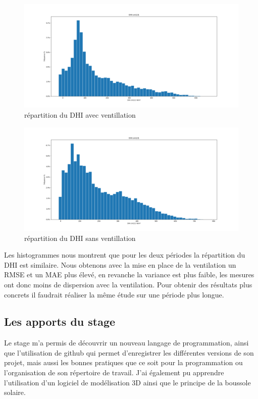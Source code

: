 \documentclass[12pt,a4paper]{article}
\begin{document}
\begin{flushleft}
\begin{figure}[H]
\centering
\includegraphics[width=15cm]{image/impact_ventillation/avril_mai_2021/histogramme_3.png}  
\caption{répartition du DHI avec ventillation}  
\end{figure}

\begin{figure}[H]
\centering
\includegraphics[width=15cm]{image/impact_ventillation/archive_2021-03-11_2021-04-20/histogramme_3.png} 
\caption{répartition du DHI sans ventillation}  
\end{figure}

Les histogrammes nous montrent que pour les deux périodes la répartition du DHI est similaire.
Nous obtenons avec la mise en place de la ventilation un RMSE et un MAE plus élevé, en revanche la variance est plus faible, les mesures ont donc moins de dispersion avec la ventilation. Pour obtenir des résultats plus concrets il faudrait réaliser la même étude sur une période plus longue.

\subsection{Les apports du stage}

Le stage m'a permis de découvrir un nouveau langage de programmation, ainsi que l'utilisation de github qui permet d'enregistrer les différentes versions de son projet, mais aussi les bonnes pratiques que ce soit pour la programmation ou l'organisation de son répertoire de travail. J'ai également pu apprendre l'utilisation d'un logiciel de modélisation 3D ainsi que le principe de la boussole solaire.



\end{flushleft}
\end{document}
